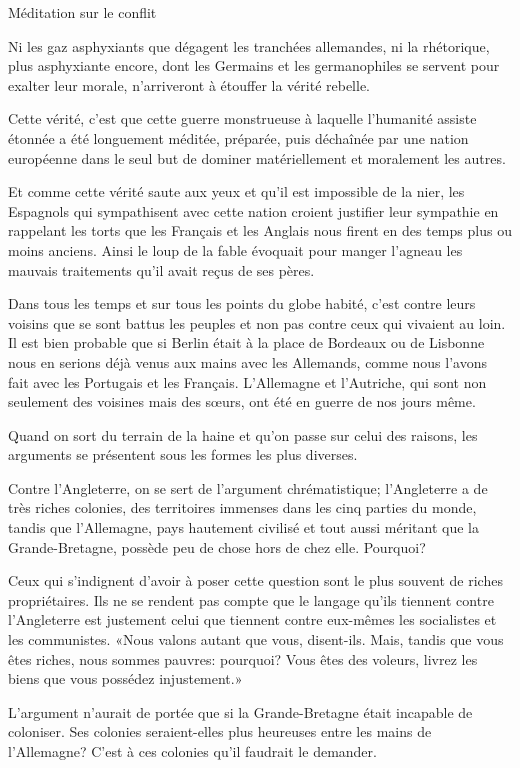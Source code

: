 \begin{chapter}{Méditation sur le conflit}

Ni les gaz asphyxiants que dégagent les tranchées allemandes, ni la
rhétorique, plus asphyxiante encore, dont les Germains et les
germanophiles se servent pour exalter leur morale, n'arriveront à
étouffer la vérité rebelle.

Cette vérité, c'est que cette guerre monstrueuse à laquelle l'humanité
assiste étonnée a été longuement méditée, préparée, puis déchaînée par
une nation européenne dans le seul but de dominer matériellement et
moralement les autres.

Et comme cette vérité saute aux yeux et qu'il est impossible de la nier,
les Espagnols qui sympathisent avec cette nation croient justifier leur
sympathie en rappelant les torts que les Français et les Anglais nous
firent en des temps plus ou moins anciens. Ainsi le loup de la fable
évoquait pour manger l'agneau les mauvais traitements qu'il avait reçus
de ses pères.

Dans tous les temps et sur tous les points du globe habité, c'est contre
leurs voisins que se sont battus les peuples et non pas contre ceux qui
vivaient au loin. Il est bien probable que si Berlin était à la place de
Bordeaux ou de Lisbonne nous en serions déjà venus aux mains avec les
Allemands, comme nous l'avons fait avec les Portugais et les Français.
L'Allemagne et l'Autriche, qui sont non seulement des voisines mais des
sœurs, ont été en guerre de nos jours même.

Quand on sort du terrain de la haine et qu'on passe sur celui des
raisons, les arguments se présentent sous les formes les plus diverses.

Contre l'Angleterre, on se sert de l'argument chrématistique;
l'Angleterre a de très riches colonies, des territoires immenses dans
les cinq parties du monde, tandis que l'Allemagne, pays hautement
civilisé et tout aussi méritant que la Grande-Bretagne, possède peu de
chose hors de chez elle. Pourquoi?

Ceux qui s'indignent d'avoir à poser cette question sont le plus souvent
de riches propriétaires. Ils ne se rendent pas compte que le langage
qu'ils tiennent contre l'Angleterre est justement celui que tiennent
contre eux-mêmes les socialistes et les communistes. «Nous valons autant
que vous, disent-ils. Mais, tandis que vous êtes riches, nous sommes
pauvres: pourquoi? Vous êtes des voleurs, livrez les biens que vous
possédez injustement.»

L'argument n'aurait de portée que si la Grande-Bretagne était incapable
de coloniser. Ses colonies seraient-elles plus heureuses entre les mains
de l'Allemagne? C'est à ces colonies qu'il faudrait le demander.


\end{chapter}
